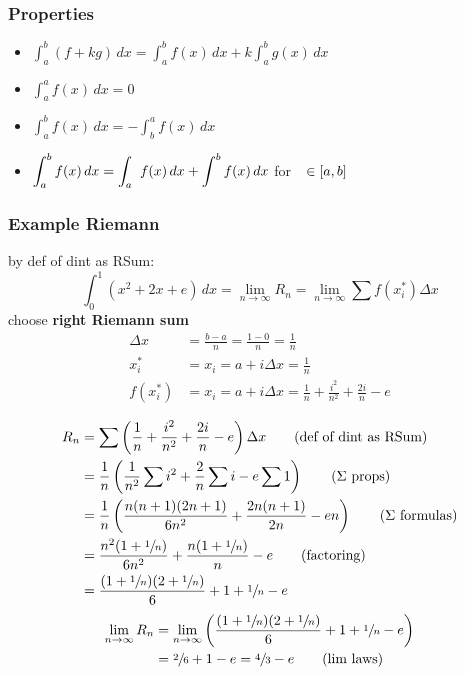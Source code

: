 		\subsubsection{Properties}
			\begin{theorem}\begin{itemize}
				\item$\displaystyle\int_a^b(f+kg)\,dx=\int_a^bf(x)\,dx+k\int_a^bg(x)\,dx$
				\item $\displaystyle\int_a^af(x)\,dx=0$
				\item $\displaystyle\int_a^bf(x)\,dx=-\int_b^af(x)\,dx$
				\item $\displaystyle\int_a^bf(x)\,dx=\int_a^{\textcolor{\colo}c}f(x)\,dx+\int_{\textcolor{\colo}c}^bf(x)\,dx$ for $\textcolor{\colo}c\in[a,b]$
			\end{itemize}\end{theorem}
		\subsubsection{Example Riemann}
			\begin{example}
				by def of dint as RSum:
				$$\int_0^1(x^2+2x+e)\,dx=\lim_{n\to\infty}R_n=\lim_{n\to\infty}\sum f(x^*_i)\Delta x$$
				choose \textbf{right Riemann sum}
				\begin{align*}
					\Delta x&=\frac{b-a}n=\frac{1-0}n=\frac1n\\
					x_i^*&=x_i=a+i\Delta x=\frac1n\\
					f(x_i^*)&=x_i=a+i\Delta x=\frac1n+\frac{i^2}{n^2}+\frac{2i}n-e\\
				\end{align*}
				\begin{align*}
					R_n&=\sum\left(\frac1n+\frac{i^2}{n^2}+\frac{2i}n-e\right)\Delta x\tag*{(def of dint as RSum)}\\
					   &=\frac1n\left(\frac1{n^2}\sum i^2+\frac2n\sum i-e\sum 1\right)\tag*{($\Sigma$ props)}\\
					   &=\frac1{n}\left(\frac{n(n+1)(2n+1)}{6n^2}+\frac{2n(n+1)}{2n}-en\right)\tag*{($\Sigma$ formulas)}\\
					   &=\frac{n^2(1+\sfrac1n)}{6n^2}+\frac{n(1+\sfrac1n)}n-e\tag*{(factoring)}\\
					   &=\frac{(1+\sfrac1n)(2+\sfrac1n)}6+1+\sfrac1n-e\\
				\end{align*}
				\begin{align*}
					\lim_{n\to\infty}R_n&=\lim_{n\to\infty}\left(\frac{(1+\sfrac1n)(2+\sfrac1n)}6+1+\sfrac1n-e\right)\\
					&=\sfrac26+1-e=\sfrac43-e\tag*{(lim laws)}\\
				\end{align*}
			\end{example}
